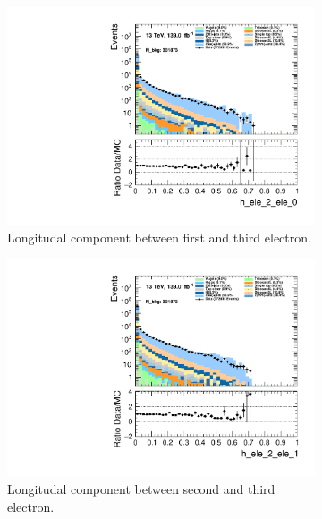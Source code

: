 \begin{figure}
    \centering
    \begin{subfigure}{.49\textwidth}
        \includegraphics[width=\textwidth]{Figures/MC_Data_comp/h_ele_2_ele_0.pdf}
        \caption{Longitudal component between first and third electron.}
        \label{fig:h_ele_2_ele_0}
    \end{subfigure}
    \hfill
    \begin{subfigure}{.49\textwidth}
        \includegraphics[width=\textwidth]{Figures/MC_Data_comp/h_ele_2_ele_1.pdf}
        \caption{Longitudal component between second and third electron. }
        \label{fig:h_ele_2_ele_1}
    \end{subfigure}
    \hfill 
    \begin{subfigure}{.49\textwidth}

\end{subfigure}
\end{figure}
